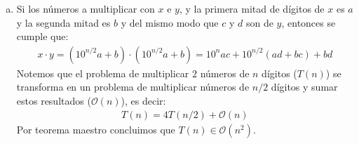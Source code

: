 \documentclass[dcc,uchile]{fcfmcourse}
\begin{document}
\begin{problems}
\begin{enumerate}[a)]
    \item Si los números a multiplicar con $x$ e $y$, y la primera mitad de dígitos de $x$ es $a$ y la segunda mitad es $b$ y del mismo modo que $c$ y $d$ son de $y$, entonces se cumple que:
    \begin{align*}
        x\cdot y = (10^{n/2}a + b) \cdot (10^{n/2}a + b) = 10^nac + 10^{n/2}(ad+bc) + bd
    \end{align*}
    Notemos que el problema de multiplicar $2$ números de $n$ dígitos ($T(n)$) se transforma en un problema de multiplicar números de $n/2$ dígitos y sumar estos resultados ($\mathcal{O}(n)$), es decir:
    \begin{align*}
        T(n) = 4T(n/2) + \mathcal{O}(n)
    \end{align*}
    Por teorema maestro concluimos que $T(n) \in \mathcal{O}(n^2)$.\\
    

\end{enumerate}
\end{problems}
\end{document}
